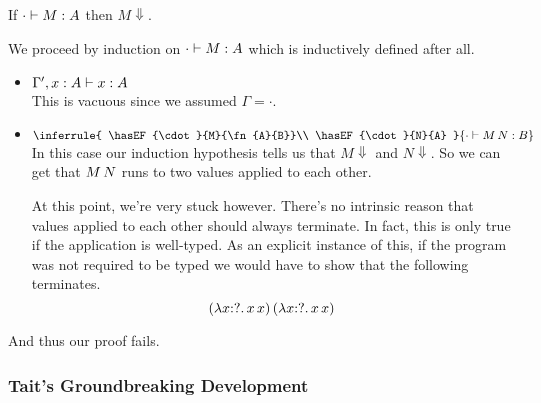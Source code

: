 \documentclass{article}
\begin{document}
\begin{claim}
  If $\hasEF{\cdot}{M}{A}$ then $M \Downarrow$.
\end{claim}
\begin{proofattempt}
  We proceed by induction on $\hasEF{\cdot}{M}{A}$ which is
  inductively defined after all.
  \begin{itemize}
  \setlength\itemsep{1em}
  \item $\hasEF{\Gamma', x : A}{x}{A}$\\
    This is vacuous since we assumed $\Gamma = \cdot$.
  \item $\inferrule{
      \hasEF{\cdot}{M}{\fn{A}{B}}\\
      \hasEF{\cdot}{N}{A}
    }{\hasEF{\cdot}{\ap{M}{N}}{B}}$\\
    In this case our induction hypothesis tells us that $M \Downarrow$
    and $N \Downarrow$. So we can get that $M\,N$ runs to two
    values applied to each other.

    At this point, we're very stuck however. There's no intrinsic
    reason that values applied to each other should always
    terminate. In fact, this is only true if the application is
    well-typed. As an explicit instance of this, if the program was
    not required to be typed we would have to show that the following
    terminates.
    \[
      (\lambda x {:} ?.\, x\,x)\,(\lambda x {:} ?.\, x\,x)
    \]
  \end{itemize}
  And thus our proof fails.
\end{proofattempt}

\subsubsection{Tait's Groundbreaking Development}
\end{document}
